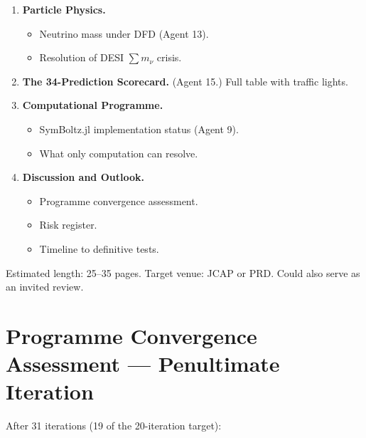 \documentclass[11pt,a4paper]{article}
\begin{document}
\begin{enumerate}
\item \textbf{Particle Physics.}
\begin{itemize}
\item Neutrino mass under DFD (Agent 13).
\item Resolution of DESI $\sum m_\nu$ crisis.
\end{itemize}

\item \textbf{The 34-Prediction Scorecard.} (Agent 15.) Full table with traffic lights.

\item \textbf{Computational Programme.}
\begin{itemize}
\item SymBoltz.jl implementation status (Agent 9).
\item What only computation can resolve.
\end{itemize}

\item \textbf{Discussion and Outlook.}
\begin{itemize}
\item Programme convergence assessment.
\item Risk register.
\item Timeline to definitive tests.
\end{itemize}
\end{enumerate}

Estimated length: 25--35 pages. Target venue: JCAP or PRD. Could also serve as an invited review.

\section{Programme Convergence Assessment --- Penultimate Iteration}

After 31 iterations (19 of the 20-iteration target):
\end{document}
